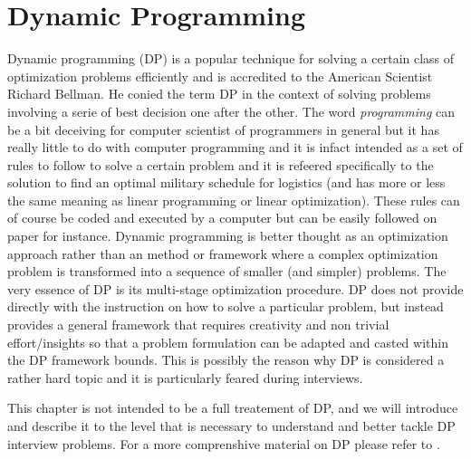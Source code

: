 \section*{Dynamic Programming}
\label{sect:appendix:DP}

Dynamic programming (DP) is a popular technique for solving a certain class of
optimization problems efficiently and is accredited to the American Scientist
Richard Bellman\cite{bellman1954}. He conied the term DP in the context of
solving problems involving a serie of best decision one after the other. 
The word \textit{programming} can be a bit deceiving for
computer scientist of programmers in general but it has really little to do with
computer programming and it is infact intended as a set of rules to 
follow to solve a certain problem and it is refeered specifically to the
solution to find an optimal military schedule for logistics (and has more or
less the same meaning as linear programming or linear optimization).  These rules can of course be coded and
executed by a computer but can be easily followed on paper for instance. 
Dynamic programming is better thought as an optimization approach rather than an
method or framework where a complex optimization problem is transformed into a sequence of
smaller (and simpler) problems. The very essence of DP is its multi-stage
optimization procedure. DP does not provide directly with the
instruction on how to solve a particular problem, but instead provides a general
framework that requires creativity and non trivial effort/insights so that a
problem formulation can be adapted and casted within the DP framework bounds.
This is possibly the reason why DP is considered a rather hard topic and it is
particularly feared during interviews. 

This chapter is not intended to be a full treatement of DP, and we will
introduce and describe it to the level that is necessary to understand and
better tackle DP interview problems. For a more comprenshive material on DP
please refer to \cite{bellman1954, cormen2009}.

